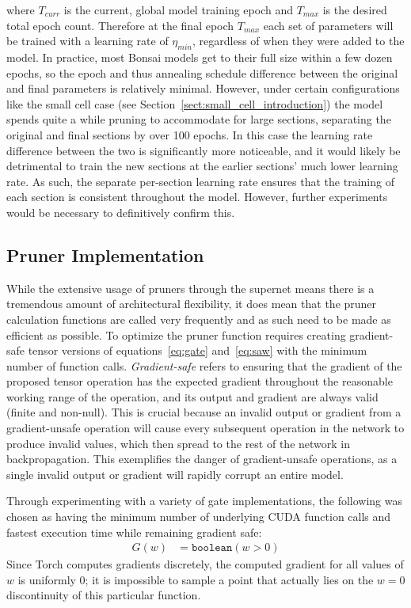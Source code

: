 \noindent where $T_{curr}$ is the current, global model training epoch and $T_{max}$ is the desired total epoch count.
Therefore at the final epoch $T_{max}$ each set of parameters will be trained with a learning rate of $\eta_{min}$,
regardless of when they were added to the model. In practice, most Bonsai models get to their full size within a few dozen epochs,
so the epoch and thus annealing schedule difference between the original and final parameters is relatively minimal.
However, under certain configurations like the small cell case (see Section~\ref{sect:small_cell_introduction}) the model spends
quite a while pruning to accommodate for large sections, separating the original and final sections by over 100 epochs.
In this case the learning rate difference between the two is significantly more noticeable, and it would likely be
detrimental to train the new sections at the earlier sections' much lower learning rate. As such, the separate per-section
learning rate ensures that the training of each section is consistent throughout the model. However, further experiments would
be necessary to definitively confirm this.

\subsection{Pruner Implementation} \label{sect:pruner_implementation}
While the extensive usage of pruners through the supernet means there is a tremendous amount of architectural flexibility,
it does mean that the pruner calculation functions are called very frequently and as such need to be made as efficient as possible. To optimize the pruner function requires
creating gradient-safe tensor versions of equations~\ref{eq:gate} and~\ref{eq:saw} with the minimum number of function calls.
\textit{Gradient-safe} refers to ensuring that the gradient of the proposed tensor operation has the expected gradient
throughout the reasonable working range of the operation, and its output and gradient are always valid (finite and non-null).
This is crucial because an invalid output or gradient from a gradient-unsafe operation will cause every subsequent operation
in the network to produce invalid values, which then spread to the rest of the network in backpropagation.
This exemplifies the danger of gradient-unsafe operations, as a single invalid output or gradient will rapidly corrupt
an entire model.

Through experimenting with a variety of gate implementations, the following was chosen as having the minimum
number of underlying CUDA function calls and fastest execution time while remaining gradient safe:
\begin{align}
	G(w) &=  \texttt{boolean}(w > 0)
\end{align}
Since Torch computes gradients discretely, the computed gradient for all values of $w$ is uniformly 0;
it is impossible to sample a point that actually lies on the $w=0$ discontinuity of this particular function.

